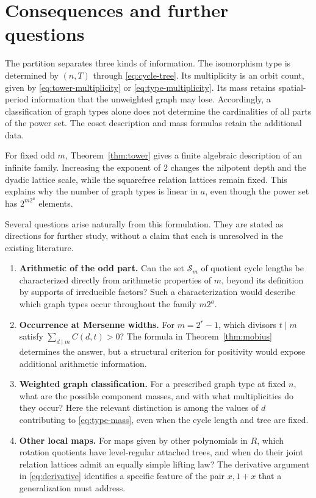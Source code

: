 \documentclass[11pt]{article}
\theoremstyle{definition}
\theoremstyle{remark}
\numberwithin{equation}{section}
\begin{document}
\section{Consequences and further questions}\label{sec:questions}

The partition separates three kinds of information. The isomorphism type
is determined by $(n,T)$ through \eqref{eq:cycle-tree}. Its multiplicity
is an orbit count, given by \eqref{eq:tower-multiplicity} or
\eqref{eq:type-multiplicity}. Its mass retains spatial-period information
that the unweighted graph may lose. Accordingly, a classification of graph
types alone does not determine the cardinalities of all parts of the power
set. The coset description and mass formulas retain the additional data.

For fixed odd $m$, Theorem~\ref{thm:tower} gives a finite algebraic
description of an infinite family. Increasing the exponent of $2$ changes
the nilpotent depth and the dyadic lattice scale, while the squarefree
relation lattices remain fixed. This explains why the number of graph
types is linear in $a$, even though the power set has $2^{m2^a}$ elements.

Several questions arise naturally from this formulation. They are stated
as directions for further study, without a claim that each is unresolved
in the existing literature.

\begin{enumerate}
\item \textbf{Arithmetic of the odd part.}
Can the set $\mathcal S_m$ of quotient cycle lengths be characterized
directly from arithmetic properties of $m$, beyond its definition by
supports of irreducible factors? Such a characterization would describe
which graph types occur throughout the family $m2^a$.

\item \textbf{Occurrence at Mersenne widths.}
For $m=2^r-1$, which divisors $t\mid m$ satisfy
$\sum_{d\mid m}C(d,t)>0$? The formula in
Theorem~\ref{thm:mobius} determines the answer, but a structural
criterion for positivity would expose additional arithmetic information.

\item \textbf{Weighted graph classification.}
For a prescribed graph type at fixed $n$, what are the possible component
masses, and with what multiplicities do they occur? Here the relevant
distinction is among the values of $d$ contributing to
\eqref{eq:type-mass}, even when the cycle length and tree are fixed.

\item \textbf{Other local maps.}
For maps given by other polynomials in $R$, which rotation quotients have
level-regular attached trees, and when do their joint relation lattices
admit an equally simple lifting law? The derivative argument in
\eqref{eq:derivative} identifies a specific feature of the pair $x,1+x$
that a generalization must address.
\end{enumerate}
\end{document}
